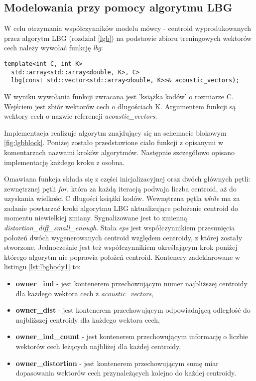 \subsection{Modelowania przy pomocy algorytmu LBG}

W celu otrzymania współczynników modelu mówcy - centroid wyprodukowanych przez algorytm LBG (rozdział \ref{lgb}) na podstawie zbioru treningowych wektorów cech należy wywołać funkcję \textit{lbg}:

\begin{lstlisting}[style=lst:cpp, caption=Deklaracja funkcji \textit{lbg}\label{lst:lbg}]
  template<int C, int K>
  std::array<std::array<double, K>, C>
  lbg(const std::vector<std::array<double, K>>& acoustic_vectors);
\end{lstlisting}

W wyniku wywołania funkcji zwracana jest 'książka kodów' o rozmiarze C. Wejściem jest zbiór wektorów cech o długościach K. Argumentem funkcji są wektory cech o nazwie referencji \textit{acoustic\_vectors}.

Implementacja realizuje algorytm znajdujący się na schemacie blokowym {\ref{fig:lgbblock}}. Poniżej zostało przedstawione ciało funkcji z opisanymi w komentarzach nazwami kroków algorytmów. Następnie szczegółowo opisano implementację każdego kroku z osobna. 

Omawiana funkcja składa się z części inicjalizacyjnej oraz dwóch głównych pętli: zewnętrznej pętli \textit{for}, która za każdą iteracją podwaja liczba centroid, aż do uzyskania wielkości C długości książki kodów. Wewnętrzna pętla \textit{while} ma za zadanie powtarzać kroki algorytmu LBG aktualizujące położenie centroid do momentu niewielkiej zmiany. Sygnalizowane jest to zmienną \textit{distortion\_diff\_small\_enough}. Stała \textit{eps} jest współczynnikiem przesunięcia położeń dwóch
wygenerowanych centroid względem centroidy, z której zostały stworzone. Jednocześnie jest też współczynnikiem określającym krok poniżej którego algorytm nie poprawia położeń centroid. Kontenery zadeklarowane w listingu {\ref{lst:lbgbody1}} to:
\begin{itemize}
\item{\textbf{owner\_ind}} - jest kontenerem przechowującym numer najbliższej centroidy dla każdego wektora cech z \textit{acoustic\_vectors},
\item{\textbf{owner\_dist}} - jest kontenerem przechowującym odpowiadającą odległość do najbliższej centroidy dla każdego wektora cech,
\item{\textbf{owner\_ind\_count}} - jest kontenerem przechowującym informację o liczbie wektorów cech leżących najbliżej dla każdej centroidy,
\item{\textbf{owner\_distortion}} - jest kontenerem przechowującym sumę miar dopasowania wektorów cech przynależących kolejno do każdej centroidy.
\end{itemize}

